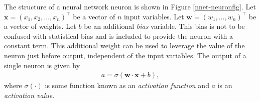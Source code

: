 The structure of a neural network neuron is shown in Figure \ref{nnet-neuronfig}. Let \\${\mathbf{x} = (x_1, x_2, \ldots, x_n)^\intercal}$ be a vector of $n$ input variables. Let $\mathbf{w} = (w_1, \ldots, w_n)^\intercal$ be a vector of weights. Let $b$ be an additional \textit{bias} variable. This bias is not to be confused with statistical bias and is included to provide the neuron with a constant term. This additional weight can be used to leverage the value of the neuron just before output, independent of the input variables. The output of a single neuron is given by
\begin{align}
	a = \sigma(\mathbf{w}\cdot\mathbf{x} + b),
\end{align}
where $\sigma(\cdot)$ is some function known as an \textit{activation function} and $a$ is an \textit{activation value}.



